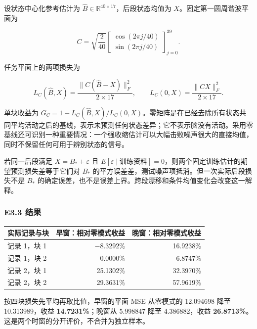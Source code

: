 \documentclass[11pt,a4paper]{article}
\begin{document}
设状态中心化参考估计为
\(\widehat B\in\mathbb R^{40\times17}\)，后段状态均值为
\(X\)。固定第一圆周谐波平面为

\[
C=\sqrt{\frac{2}{40}}
\begin{bmatrix}
\cos(2\pi j/40)\\
\sin(2\pi j/40)
\end{bmatrix}_{j=0}^{39}.
\]

任务平面上的两项损失为

\[
L_C(\widehat B,X)=\frac{\|C(\widehat B-X)\|_F^2}{2\times17},
\qquad L_C(0,X)=\frac{\|CX\|_F^2}{2\times17}.
\]

单块收益为
\(G_C=1-L_C(\widehat B,X)/L_C(0,X)\)。零矩阵是在已经去除所有状态共同平均活动之后的基线，表示未预测任何状态差异；它不表示脑没有活动。采用零基线还可识别一种重要情况：一个强收缩估计可以大幅击败噪声很大的直接均值，同时不保留任何可用于辨别状态的信号。

若同一后段满足 \(X=B_*+\varepsilon\) 且
\(E[\varepsilon\mid\text{训练资料}]=0\)，则两个固定训练估计的期望预测损失差等于它们对
\(B_*\) 的平方误差差，测试噪声项抵消。但一次实际后段损失不是 \(B_*\)
的确定误差，也不是误差上界。跨段漂移和条件均值变化会改变这一解释。

\subsubsection{E3.3 结果}\label{e3.3-ux7ed3ux679c}


\begingroup
\small

\begin{longtable}[]{@{}lrr@{}}
\toprule\noalign{}
实际记录与块 & 早窗：相对零模式收益 & 晚窗：相对零模式收益 \\
\midrule\noalign{}
\endhead
\bottomrule\noalign{}
\endlastfoot
记录 1，块 1 & \(-8.3292\)\% & 16.9238\% \\
记录 1，块 2 & 0.0000\% & 6.8747\% \\
记录 2，块 1 & 25.1302\% & 32.3970\% \\
记录 2，块 2 & 29.3631\% & 57.9619\% \\
\end{longtable}

\endgroup

按四块损失先平均再取比值，早窗的平面 MSE 从零模式的 12.094698 降至
10.313989，收益 \textbf{14.7231\%}；晚窗从 5.998847 降至 4.386882，收益
\textbf{26.8713\%}。这是两个时窗的分开评价，不合并为独立样本。
\end{document}
